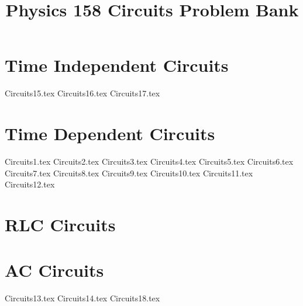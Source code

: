 \documentclass[11pt, fleqn]{article}
\title{Physics 158 Circuits Problem Bank}
\author{}
\date{}
\begin{document}
\allowdisplaybreaks

\maketitle

\section*{Time Independent Circuits}
{Circuits15.tex}
{Circuits16.tex}
{Circuits17.tex}

\section*{Time Dependent Circuits}
{Circuits1.tex}
{Circuits2.tex}
{Circuits3.tex}
{Circuits4.tex}
{Circuits5.tex}
{Circuits6.tex}
{Circuits7.tex}
{Circuits8.tex}
{Circuits9.tex}
{Circuits10.tex}
{Circuits11.tex}
{Circuits12.tex}

\section*{RLC Circuits}

\section*{AC Circuits}
{Circuits13.tex}
{Circuits14.tex}
{Circuits18.tex}
\end{document}
